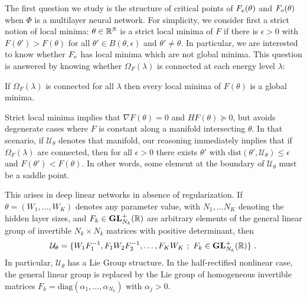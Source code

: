 The first question we study is the structure of critical points of $F_{e}(\theta)$ and $F_{o}(\theta)$
when $\Phi$ is a multilayer neural network. 
For simplicity, we consider first a strict notion of local minima: 
$\theta \in {\mathbb{R}}^S $ is a strict local minima of $F$ if there is $\epsilon>0$ with $F(\theta') > F(\theta)$ for all $\theta' \in B(\theta,\epsilon)$ and $\theta'\neq \theta$.
In particular, we are interested to know whether
$F_{e}$ has local minima which are not global minima. 
This question is answered by 
knowing whether $\Omega_F(\lambda)$ is connected at each energy level $\lambda$:

\begin{proposition}
\label{connectedminima}
If $\Omega_F(\lambda)$ is connected for all $\lambda$ then every local minima of $F(\theta)$ is a global minima. 
\end{proposition}

Strict local minima implies that $\nabla F(\theta) =0$ and $H F(\theta) \succeq 0$, but avoids degenerate cases where $F$ is constant along a manifold intersecting $\theta$. In that scenario, if $\mathcal{U}_\theta$ denotes that manifold, our reasoning immediately 
implies that if $\Omega_F(\lambda)$ are connected, then for all $\epsilon > 0$ there exists $\theta'$ with $\text{dist}(\theta',\mathcal{U}_\theta) \leq \epsilon$ and $F(\theta') < F(\theta)$. In other words, some element at the boundary of $\mathcal{U}_\theta$ must be a saddle point. 

This arises in deep linear networks in absence of regularization. If $\theta = (W_1, \dots, W_K)$ denotes any parameter value, with $N_1, \dots N_K$ denoting the hidden layer sizes, and $F_k \in \mathbf{GL}_{N_k}^{+}({\mathbb{R}})$ are arbitrary elements of the general linear group of invertible $N_k \times N_k$ matrices with positive determinant, then   
$$\mathcal{U}_\theta = \{ W_1 F_1^{-1}, F_1 W_2 F_2^{-1}, \dots, F_K W_K  ~;~ F_k \in \mathbf{GL}_{N_k}^{+}({\mathbb{R}}) \}~. $$
In particular, $\mathcal{U}_\theta$ has a Lie Group structure. In the half-rectified nonlinear case, the general linear group is replaced by the Lie group of homogeneous invertible matrices $F_k = \text{diag}(\alpha_1, \dots, \alpha_{N_k})$ with $\alpha_j > 0$. 

